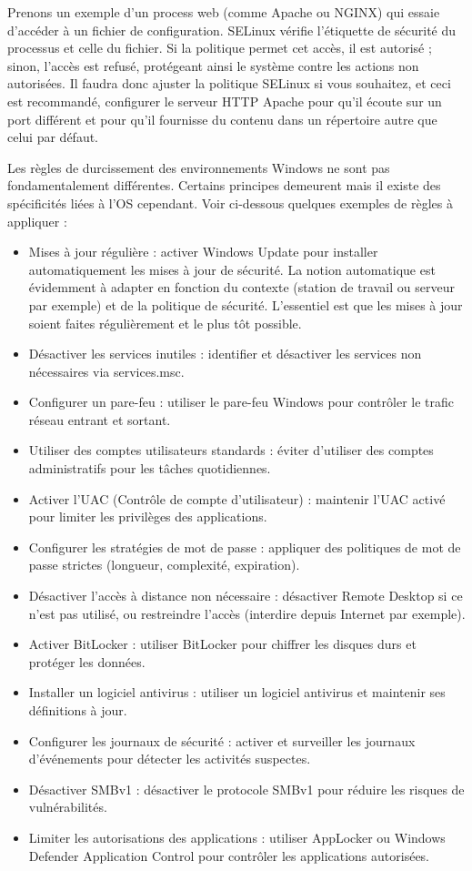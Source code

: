 Prenons un exemple d'un process web (comme Apache ou NGINX) qui essaie d'accéder à un fichier de configuration. SELinux vérifie l'étiquette de sécurité du processus et celle du fichier. Si la politique permet cet accès, il est autorisé ; sinon, l'accès est refusé, protégeant ainsi le système contre les actions non autorisées. Il faudra donc ajuster la politique SELinux si vous souhaitez, et ceci est recommandé, configurer le serveur HTTP Apache pour qu'il écoute sur un port différent et pour qu'il fournisse du contenu dans un répertoire autre que celui par défaut.

Les règles de durcissement des environnements Windows ne sont pas fondamentalement différentes. Certains principes demeurent mais il existe des spécificités liées à l'OS cependant. 
Voir ci-dessous quelques exemples de règles à appliquer : 
\begin{itemize}
    \item Mises à jour régulière : activer Windows Update pour installer automatiquement les mises à jour de sécurité. La notion automatique est évidemment à adapter en fonction du contexte (station de travail ou serveur par exemple) et de la politique de sécurité. L'essentiel est que les mises à jour soient faites régulièrement et le plus tôt possible.
    \item Désactiver les services inutiles : identifier et désactiver les services non nécessaires via services.msc.
    \item Configurer un pare-feu : utiliser le pare-feu Windows pour contrôler le trafic réseau entrant et sortant.
    \item Utiliser des comptes utilisateurs standards : éviter d'utiliser des comptes administratifs pour les tâches quotidiennes.
    \item Activer l'UAC (Contrôle de compte d'utilisateur) : maintenir l'UAC activé pour limiter les privilèges des applications.
    \item Configurer les stratégies de mot de passe : appliquer des politiques de mot de passe strictes (longueur, complexité, expiration).
    \item Désactiver l'accès à distance non nécessaire : désactiver Remote Desktop si ce n'est pas utilisé, ou restreindre l'accès (interdire depuis Internet par exemple).
    \item Activer BitLocker : utiliser BitLocker pour chiffrer les disques durs et protéger les données.
    \item Installer un logiciel antivirus : utiliser un logiciel antivirus et maintenir ses définitions à jour.
    \item Configurer les journaux de sécurité : activer et surveiller les journaux d'événements pour détecter les activités suspectes.
    \item Désactiver SMBv1 : désactiver le protocole SMBv1 pour réduire les risques de vulnérabilités.
    \item Limiter les autorisations des applications : utiliser AppLocker ou Windows Defender Application Control pour contrôler les applications autorisées.
\end{itemize}

